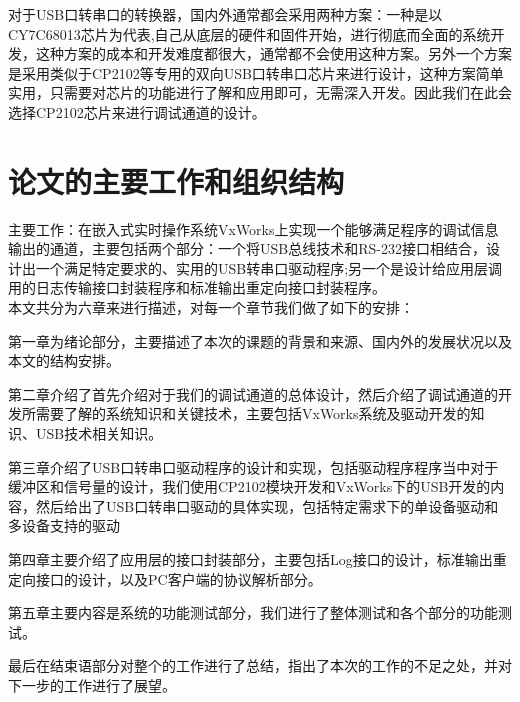 	
	对于USB口转串口的转换器，国内外通常都会采用两种方案：一种是以CY7C68013芯片为代表,自己从底层的硬件和固件开始，进行彻底而全面的系统开发，这种方案的成本和开发难度都很大，通常都不会使用这种方案。另外一个方案是采用类似于CP2102等专用的双向USB口转串口芯片来进行设计，这种方案简单实用，只需要对芯片的功能进行了解和应用即可，无需深入开发\cite{Yao2009Design}\cite{Zhou2002The}。因此我们在此会选择CP2102芯片来进行调试通道的设计。	


	
	

\section{论文的主要工作和组织结构}	
	主要工作：在嵌入式实时操作系统VxWorks上实现一个能够满足程序的调试信息输出的通道，主要包括两个部分：一个将USB总线技术和RS-232接口相结合，设计出一个满足特定要求的、实用的USB转串口驱动程序;另一个是设计给应用层调用的日志传输接口封装程序和标准输出重定向接口封装程序。\\
 本文共分为六章来进行描述，对每一个章节我们做了如下的安排：
 
 第一章为绪论部分，主要描述了本次的课题的背景和来源、国内外的发展状况以及本文的结构安排。
 
 第二章介绍了首先介绍对于我们的调试通道的总体设计，然后介绍了调试通道的开发所需要了解的系统知识和关键技术，主要包括VxWorks系统及驱动开发的知识、USB技术相关知识。
 
 第三章介绍了USB口转串口驱动程序的设计和实现，包括驱动程序程序当中对于缓冲区和信号量的设计，我们使用CP2102模块开发和VxWorks下的USB开发的内容，然后给出了USB口转串口驱动的具体实现，包括特定需求下的单设备驱动和多设备支持的驱动
 
 第四章主要介绍了应用层的接口封装部分，主要包括Log接口的设计，标准输出重定向接口的设计，以及PC客户端的协议解析部分。
 
 第五章主要内容是系统的功能测试部分，我们进行了整体测试和各个部分的功能测试。
 
 最后在结束语部分对整个的工作进行了总结，指出了本次的工作的不足之处，并对下一步的工作进行了展望。 

